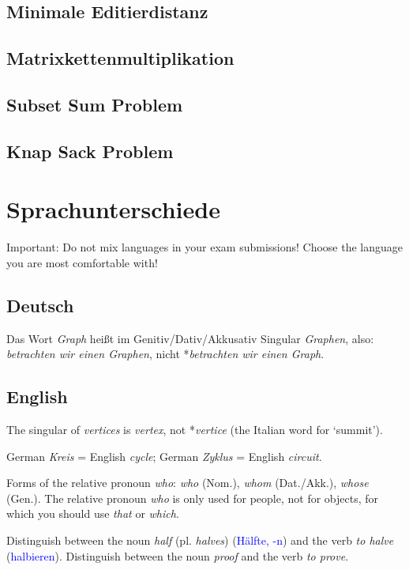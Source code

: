 \documentclass[a4paper]{article}
\begin{document}
\subsection{Minimale Editierdistanz}

\subsection{Matrixkettenmultiplikation}

\subsection{Subset Sum Problem}

\subsection{Knap Sack Problem}




\newpage
\section{Sprachunterschiede}
Important: Do not mix languages in your exam submissions! Choose the language you are most comfortable with!

\subsection{Deutsch}

Das Wort \emph{Graph} hei\ss t im Genitiv/Dativ/Akkusativ Singular \emph{Graphen}, also: \emph{betrachten wir einen Graphen}, nicht *\emph{betrachten wir einen Graph}.

\subsection{English}

The singular of \emph{vertices} is \emph{vertex}, not *\emph{vertice} (the Italian word for `summit').

German \emph{Kreis} = English \emph{cycle}; German \emph{Zyklus} = English \emph{circuit}.

Forms of the relative pronoun \emph{who}: \emph{who} (Nom.), \emph{whom} (Dat./Akk.), \emph{whose} (Gen.). The relative pronoun \emph{who} is only used for people, not for objects, for which you should use \emph{that} or \emph{which}.

Distinguish between the noun \emph{half} (pl. \emph{halves}) (\textcolor{blue}{Hälfte, -n}) and the verb \emph{to halve} (\textcolor{blue}{halbieren}). Distinguish between the noun \emph{proof} and the verb \emph{to prove}.
\end{document}
